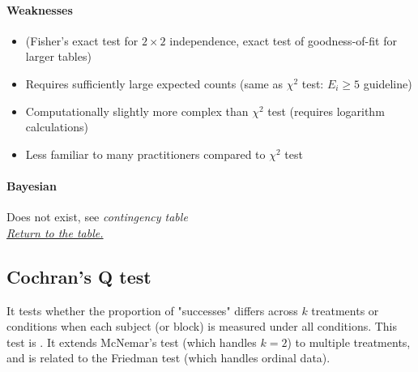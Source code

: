 \paragraph{Weaknesses}
\begin{itemize}
    \item {} (Fisher's exact test for $2\times 2$ independence,
        exact test of goodness-of-fit for larger tables)
    \item Requires sufficiently large expected counts (same as $\chi^2$ test: $E_i \geq 5$ guideline)
    \item Computationally slightly more complex than $\chi^2$ test (requires logarithm calculations)
    \item Less familiar to many practitioners compared to $\chi^2$ test
\end{itemize}

\paragraph{Bayesian}
Does not exist, see \emph{contingency table} \\

\textit{\hyperref[statistical_method_table]{Return to the table.}}


\subsection{Cochran's Q test}

 It tests whether the proportion of "successes" differs across
$k$ treatments or conditions when each subject (or block) is measured under all conditions. This test
is . It extends
McNemar's test (which handles $k=2$) to multiple treatments, and is related to the Friedman test
(which handles ordinal data).


